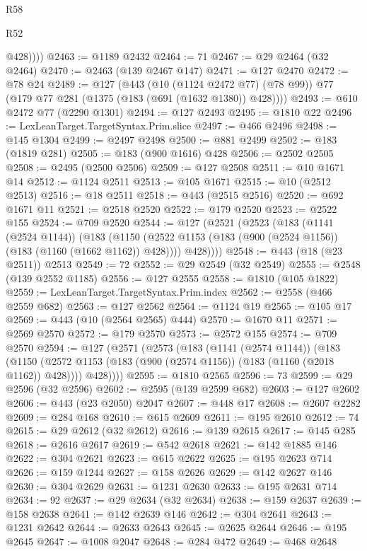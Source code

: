 \begin{lexlean}{R58}
\begin{lexlean}{R52}
\begin{coremodule}
{{{{{{{{{{{{{{{{{{{{{{{{{{{{{{{{{{{{{{{{{{{{{{{{{{{{{{{{{{{{{{{{{{{{{{{{{{{{{{{{{{{{{{{{{{{{{{{{{{{{{{{{{{{{{{{{{{{{{{{{{{{{{{{{{{{{{{{{{{{{{{{{{{{{{{{{{{{{{{{{{{{{{{{{{{{{{{{{{{{{{{{{{{{{{{{{{{{{{{            @428))))
@2463 := @1189 @2432
@2464 := 71
@2467 := @29 @2464 (@32 @2464)
@2470 := @2463 (@139 @2467 @147)
@2471 := @127 @2470
@2472 := @78 @24
@2489 := @127
    (@443
      (@10 (@1124 @2472 @77) (@78 @99))
      @77
      (@179 @77 @281 (@1375 (@183 (@691 (@1632 @1380)) @428))))
@2493 := @610 @2472 @77 (@2290 @1301)
@2494 := @127 @2493
@2495 := @1810 @22
@2496 := LexLeanTarget.TargetSyntax.Prim.slice
@2497 := @466 @2496
@2498 := @145 @1304
@2499 := @2497 @2498
@2500 := @881 @2499
@2502 := @183 (@1819 @281)
@2505 := @183 (@900 @1616) @428
@2506 := @2502 @2505
@2508 := @2495 (@2500 @2506)
@2509 := @127 @2508
@2511 := @10 @1671 @14
@2512 := @1124 @2511
@2513 := @105 @1671
@2515 := @10 (@2512 @2513)
@2516 := @18 @2511
@2518 := @443 (@2515 @2516)
@2520 := @692 @1671 @11
@2521 := @2518 @2520
@2522 := @179 @2520
@2523 := @2522 @155
@2524 := @709 @2520
@2544 := @127
    (@2521
      (@2523
        (@183
          (@1141 (@2524 @1144))
          (@183
            (@1150 (@2522 @1153 (@183 (@900 (@2524 @1156)) (@183 (@1160 (@1662 @1162)) @428))))
            @428))))
@2548 := @443 (@18 (@23 @2511)) @2513
@2549 := 72
@2552 := @29 @2549 (@32 @2549)
@2555 := @2548 (@139 @2552 @1185)
@2556 := @127 @2555
@2558 := @1810 (@105 @1822)
@2559 := LexLeanTarget.TargetSyntax.Prim.index
@2562 := @2558 (@466 @2559 @682)
@2563 := @127 @2562
@2564 := @1124 @19
@2565 := @105 @17
@2569 := @443 (@10 (@2564 @2565) @444)
@2570 := @1670 @11
@2571 := @2569 @2570
@2572 := @179 @2570
@2573 := @2572 @155
@2574 := @709 @2570
@2594 := @127
    (@2571
      (@2573
        (@183
          (@1141 (@2574 @1144))
          (@183
            (@1150 (@2572 @1153 (@183 (@900 (@2574 @1156)) (@183 (@1160 (@2018 @1162)) @428))))
            @428))))
@2595 := @1810 @2565
@2596 := 73
@2599 := @29 @2596 (@32 @2596)
@2602 := @2595 (@139 @2599 @682)
@2603 := @127 @2602
@2606 := @443 (@23 @2050) @2047
@2607 := @448 @17
@2608 := @2607 @2282
@2609 := @284 @168
@2610 := @615 @2609
@2611 := @195 @2610
@2612 := 74
@2615 := @29 @2612 (@32 @2612)
@2616 := @139 @2615
@2617 := @145 @285
@2618 := @2616 @2617
@2619 := @542 @2618
@2621 := @142 @1885 @146
@2622 := @304 @2621
@2623 := @615 @2622
@2625 := @195 @2623 @714
@2626 := @159 @1244
@2627 := @158 @2626
@2629 := @142 @2627 @146
@2630 := @304 @2629
@2631 := @1231 @2630
@2633 := @195 @2631 @714
@2634 := 92
@2637 := @29 @2634 (@32 @2634)
@2638 := @159 @2637
@2639 := @158 @2638
@2641 := @142 @2639 @146
@2642 := @304 @2641
@2643 := @1231 @2642
@2644 := @2633 @2643
@2645 := @2625 @2644
@2646 := @195 @2645
@2647 := @1008 @2047
@2648 := @284 @472
@2649 := @468 @2648
}}}}}}}}}}}}}}}}}}}}}}}}}}}}}}}}}}}}}}}}}}}}}}}}}}}}}}}}}}}}}}}}}}}}}}}}}}}}}}}}}}}}}}}}}}}}}}}}}}}}}}}}}}}}}}}}}}}}}}}}}}}}}}}}}}}}}}}}}}}}}}}}}}}}}}}}}}}}}}}}}}}}}}}}}}}}}}}}}}}}}}}}}}}}}}}}}}}}}}
\end{coremodule}
\end{lexlean}
\end{lexlean}

